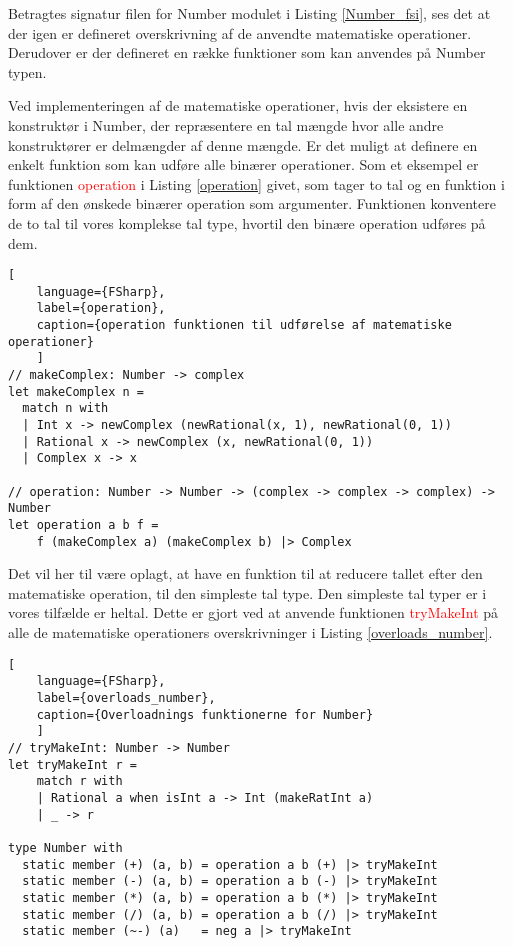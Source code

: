 Betragtes signatur filen for Number modulet i Listing \ref{Number_fsi}, ses det at der igen er defineret overskrivning af de anvendte matematiske operationer. Derudover er der defineret en række funktioner som kan anvendes på Number typen. 



Ved implementeringen af de matematiske operationer, hvis der eksistere en konstruktør i Number, der repræsentere en tal mængde hvor alle andre konstruktører er delmængder af denne mængde. Er det muligt at definere en enkelt funktion som kan udføre alle binærer operationer. Som et eksempel er funktionen \textcolor{red}{operation} i Listing \ref{operation} givet, som tager to tal og en funktion i form af den ønskede binærer operation som argumenter. Funktionen konventere de to tal til vores komplekse tal type, hvortil den binære operation udføres på dem. 

\begin{lstlisting}[
    language={FSharp},
    label={operation}, 
    caption={operation funktionen til udførelse af matematiske operationer}
    ]
// makeComplex: Number -> complex
let makeComplex n =
  match n with
  | Int x -> newComplex (newRational(x, 1), newRational(0, 1))
  | Rational x -> newComplex (x, newRational(0, 1))
  | Complex x -> x

// operation: Number -> Number -> (complex -> complex -> complex) -> Number
let operation a b f =
    f (makeComplex a) (makeComplex b) |> Complex

\end{lstlisting}

Det vil her til være oplagt, at have en funktion til at reducere tallet efter den matematiske operation, til den simpleste tal type. Den simpleste tal typer er i vores tilfælde er heltal. Dette er gjort ved at anvende funktionen \textcolor{red}{tryMakeInt} på alle de matematiske operationers overskrivninger i Listing \ref{overloads_number}. 

\begin{lstlisting}[
    language={FSharp},
    label={overloads_number}, 
    caption={Overloadnings funktionerne for Number}
    ]
// tryMakeInt: Number -> Number
let tryMakeInt r =
    match r with
    | Rational a when isInt a -> Int (makeRatInt a)
    | _ -> r
    
type Number with
  static member (+) (a, b) = operation a b (+) |> tryMakeInt
  static member (-) (a, b) = operation a b (-) |> tryMakeInt
  static member (*) (a, b) = operation a b (*) |> tryMakeInt
  static member (/) (a, b) = operation a b (/) |> tryMakeInt
  static member (~-) (a)   = neg a |> tryMakeInt
\end{lstlisting}

